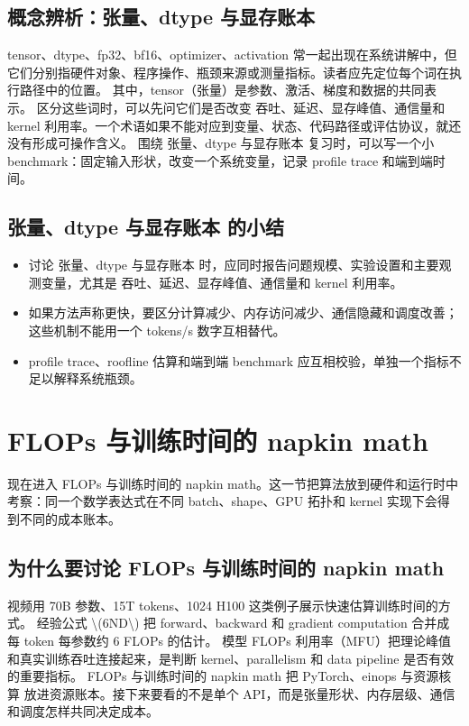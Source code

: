 \documentclass[a4paper]{article}
\begin{document}
\subsection{概念辨析：张量、dtype 与显存账本}
tensor、dtype、fp32、bf16、optimizer、activation 常一起出现在系统讲解中，但它们分别指硬件对象、程序操作、瓶颈来源或测量指标。读者应先定位每个词在执行路径中的位置。
其中，tensor（张量）是参数、激活、梯度和数据的共同表示。
区分这些词时，可以先问它们是否改变 吞吐、延迟、显存峰值、通信量和 kernel 利用率。一个术语如果不能对应到变量、状态、代码路径或评估协议，就还没有形成可操作含义。
围绕 张量、dtype 与显存账本 复习时，可以写一个小 benchmark：固定输入形状，改变一个系统变量，记录 profile trace 和端到端时间。
\subsection{张量、dtype 与显存账本 的小结}
\begin{itemize}
\item 讨论 张量、dtype 与显存账本 时，应同时报告问题规模、实验设置和主要观测变量，尤其是 吞吐、延迟、显存峰值、通信量和 kernel 利用率。
\item 如果方法声称更快，要区分计算减少、内存访问减少、通信隐藏和调度改善；这些机制不能用一个 tokens/s 数字互相替代。
\item profile trace、roofline 估算和端到端 benchmark 应互相校验，单独一个指标不足以解释系统瓶颈。
\end{itemize}
\section{FLOPs 与训练时间的 napkin math}
现在进入 FLOPs 与训练时间的 napkin math。这一节把算法放到硬件和运行时中考察：同一个数学表达式在不同 batch、shape、GPU 拓扑和 kernel 实现下会得到不同的成本账本。
\subsection{为什么要讨论 FLOPs 与训练时间的 napkin math}
视频用 70B 参数、15T tokens、1024 H100 这类例子展示快速估算训练时间的方式。
经验公式 \textbackslash{}(6ND\textbackslash{}) 把 forward、backward 和 gradient computation 合并成每 token 每参数约 6 FLOPs 的估计。
模型 FLOPs 利用率（MFU）把理论峰值和真实训练吞吐连接起来，是判断 kernel、parallelism 和 data pipeline 是否有效的重要指标。
FLOPs 与训练时间的 napkin math 把 PyTorch、einops 与资源核算 放进资源账本。接下来要看的不是单个 API，而是张量形状、内存层级、通信和调度怎样共同决定成本。
\end{document}

